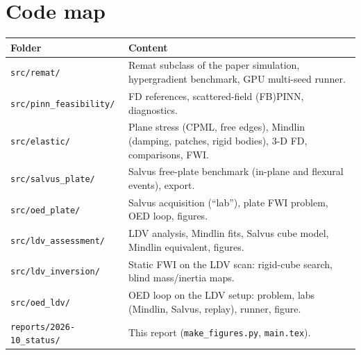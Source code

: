 \documentclass[11pt,a4paper]{article}
\newcommand{\code}[1]{\texttt{\footnotesize #1}}
\begin{document}
\appendix
\section{Code map}
\begin{table}[h]
\centering\small
\begin{tabularx}{\textwidth}{@{}p{4.6cm}L@{}}
\toprule
Folder & Content \\
\midrule
\code{src/remat/} & Remat subclass of the paper simulation, hypergradient benchmark, GPU multi-seed runner. \\
\code{src/pinn\_feasibility/} & FD references, scattered-field (FB)PINN, diagnostics. \\
\code{src/elastic/} & Plane stress (CPML, free edges), Mindlin (damping, patches, rigid bodies), 3-D FD, comparisons, FWI. \\
\code{src/salvus\_plate/} & Salvus free-plate benchmark (in-plane and flexural events), export. \\
\code{src/oed\_plate/} & Salvus acquisition (``lab''), plate FWI problem, OED loop, figures. \\
\code{src/ldv\_assessment/} & LDV analysis, Mindlin fits, Salvus cube model, Mindlin equivalent, figures. \\
\code{src/ldv\_inversion/} & Static FWI on the LDV scan: rigid-cube search, blind mass/inertia maps. \\
\code{src/oed\_ldv/} & OED loop on the LDV setup: problem, labs (Mindlin, Salvus, replay), runner, figure. \\
\code{reports/2026-10\_status/} & This report (\code{make\_figures.py}, \code{main.tex}). \\
\bottomrule
\end{tabularx}
\end{table}
\end{document}
